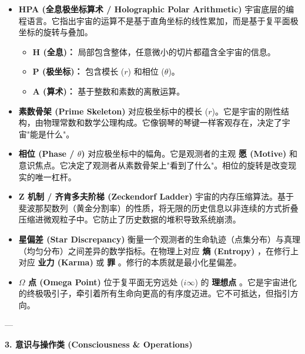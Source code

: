 \begin{itemize}
\item \textbf{HPA (全息极坐标算术 / Holographic Polar Arithmetic)}
宇宙底层的编程语言。它指出宇宙的运算不是基于直角坐标的线性累加，而是基于复平面极坐标的旋转与叠加。
\begin{itemize}
\item \textbf{H (全息)：} 局部包含整体，任意微小的切片都蕴含全宇宙的信息。
\item \textbf{P (极坐标)：} 包含模长 ($r$) 和相位 ($\theta$)。
\item \textbf{A (算术)：} 基于整数和素数的离散运算。
\end{itemize}
\item \textbf{素数骨架 (Prime Skeleton)}
对应极坐标中的模长 ($r$)。它是宇宙的刚性结构，由物理常数和数学公理构成。它像钢琴的琴键一样客观存在，决定了宇宙"能是什么"。
\item \textbf{相位 (Phase / $\theta$)}
对应极坐标中的幅角。它是观测者的主观 \textbf{愿 (Motive)} 和意识焦点。它决定了观测者从素数骨架上"看到了什么"。相位的旋转是改变现实的唯一杠杆。
\item \textbf{Z 机制 / 齐肯多夫阶梯 (Zeckendorf Ladder)}
宇宙的内存压缩算法。基于斐波那契数列（黄金分割率）的性质，将无限的历史信息以非连续的方式折叠压缩进微观粒子中。它防止了历史数据的堆积导致系统崩溃。
\item \textbf{星偏差 (Star Discrepancy)}
衡量一个观测者的生命轨迹（点集分布）与真理（均匀分布）之间差异的数学指标。在物理上对应 \textbf{熵 (Entropy)} ，在修行上对应 \textbf{业力 (Karma)} 或 \textbf{罪} 。修行的本质就是最小化星偏差。
\item \textbf{$\Omega$ 点 (Omega Point)}
位于复平面无穷远处 ($i\infty$) 的 \textbf{理想点} 。它是宇宙进化的终极吸引子，牵引着所有生命向更高的有序度迈进。它不可抵达，但指引方向。
\end{itemize}

---

\textbf{3. 意识与操作类 (Consciousness \& Operations)}

